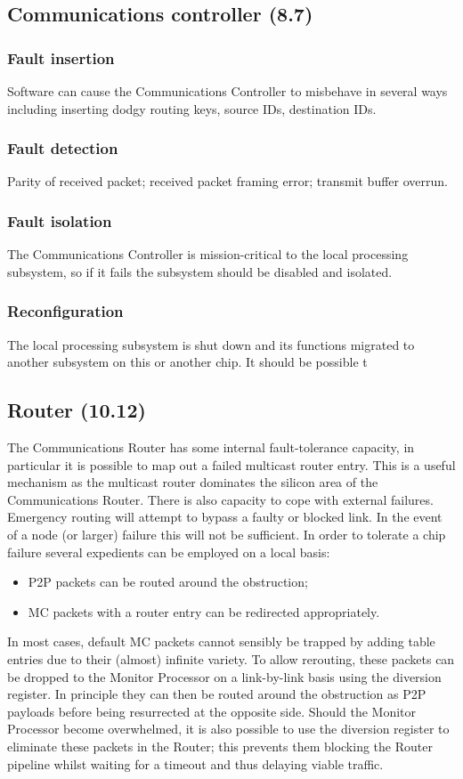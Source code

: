 \documentclass[11pt]{article}
\newenvironment{itmz}{
	\begin{itemize}
		\setlength{\itemsep}{0pt}
		\setlength{\parskip}{0pt}
	}{\end{itemize}}
\begin{document}
\subsection{Communications controller (8.7)}
\subsubsection*{Fault insertion}
Software can cause the Communications Controller to misbehave in several ways including
inserting dodgy routing keys, source IDs, destination IDs.
\subsubsection*{Fault detection}
Parity of received packet; received packet framing error; transmit buffer overrun.
\subsubsection*{Fault isolation}
The Communications Controller is mission-critical to the local processing subsystem, so if it fails
the subsystem should be disabled and isolated.
\subsubsection*{Reconfiguration}
The local processing subsystem is shut down and its functions migrated to another subsystem on
this or another chip. It should be possible t

\subsection{Router (10.12)}
The Communications Router has some internal fault-tolerance capacity, in particular it is possible
to map out a failed multicast router entry. This is a useful mechanism as the multicast router
dominates the silicon area of the Communications Router.
There is also capacity to cope with external failures. Emergency routing will attempt to bypass a
faulty or blocked link. In the event of a node (or larger) failure this will not be sufficient. In order to
tolerate a chip failure several expedients can be employed on a local basis:
\begin{itmz}
\item P2P packets can be routed around the obstruction;
\item MC packets with a router entry can be redirected appropriately.
\end{itmz}
In most cases, default MC packets cannot sensibly be trapped by adding table entries due to their
(almost) infinite variety. To allow rerouting, these packets can be dropped to the Monitor Processor
on a link-by-link basis using the diversion register. In principle they can then be routed around the
obstruction as P2P payloads before being resurrected at the opposite side.
Should the Monitor Processor become overwhelmed, it is also possible to use the diversion register
to eliminate these packets in the Router; this prevents them blocking the Router pipeline whilst
waiting for a timeout and thus delaying viable traffic.
\end{document}
